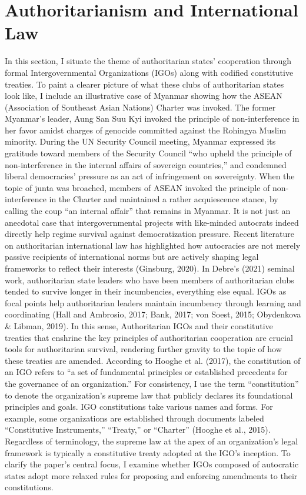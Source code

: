 \documentclass[12pt]{article}
\begin{document}
\section{Authoritarianism and International Law}
In this section, I situate the theme of authoritarian states’ cooperation through formal Intergovernmental Organizations (IGOs) along with codified constitutive treaties. To paint a clearer picture of what these clubs of authoritarian states look like, I include an illustrative case of Myanmar showing how the ASEAN (Association of Southeast Asian Nations) Charter was invoked. The former Myanmar’s leader, Aung San Suu Kyi invoked the principle of non-interference in her favor amidst charges of genocide committed against the Rohingya Muslim minority. During the UN Security Council meeting, Myanmar expressed its gratitude toward members of the Security Council “who upheld the principle of non-interference in the internal affairs of sovereign countries,” and condemned  liberal democracies’ pressure as an act of infringement on sovereignty.  When the topic of junta was broached, members of ASEAN invoked the principle of non-interference in the Charter  and maintained a rather acquiescence stance, by calling the coup “an internal affair” that remains in Myanmar. 
It is not just an anecdotal case that intergovernmental projects with like-minded autocrats indeed directly help regime survival against democratization pressure. Recent literature on authoritarian international law has highlighted how autocracies are not merely passive recipients of international norms but are actively shaping legal frameworks to reflect their interests (Ginsburg, 2020). In Debre’s (2021) seminal work, authoritarian state leaders who have been members of authoritarian clubs tended to survive longer in their incumbencies, everything else equal. IGOs as focal points help authoritarian leaders maintain incumbency through learning and coordinating (Hall and Ambrosio, 2017; Bank, 2017; von Soest, 2015; Obydenkova \& Libman, 2019). In this sense, Authoritarian IGOs and their constitutive treaties that enshrine the key principles of authoritarian cooperation are crucial tools for authoritarian survival, rendering further gravity to the topic of how these treaties are amended.
According to Hooghe et al. (2017), the constitution of an IGO refers to “a set of fundamental principles or established precedents for the governance of an organization.” For consistency, I use the term “constitution” to denote the organization’s supreme law that publicly declares its foundational principles and goals. IGO constitutions take various names and forms. For example, some organizations are established through documents labeled “Constitutive Instruments,” “Treaty,” or “Charter” (Hooghe et al., 2015). Regardless of terminology, the supreme law at the apex of an organization’s legal framework is typically a constitutive treaty adopted at the IGO’s inception. To clarify the paper’s central focus, I examine whether IGOs composed of autocratic states adopt more relaxed rules for proposing and enforcing amendments to their constitutions.
\end{document}
